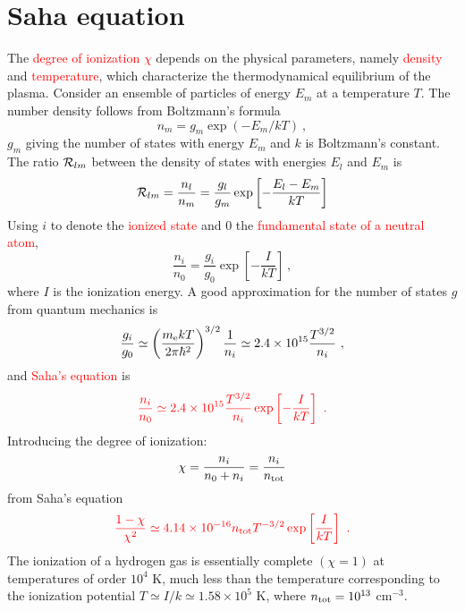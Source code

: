 \documentclass[12pt,a4paper]{article}
\begin{document}
\section{Saha equation}
\cite{2015bps..book.....C} The \textcolor{red}{degree of ionization $\chi$} depends on the physical parameters, namely \textcolor{red}{density} and \textcolor{red}{temperature}, which characterize the thermodynamical equilibrium of the plasma. Consider an ensemble of particles of energy $E_m$ at a temperature $T$. The number density follows from Boltzmann’s formula
\begin{equation*}
n_m = g_m \exp (-E_m/kT) ~,
\end{equation*}
$g_m$ giving the number of states with energy $E_m$ and $k$ is Boltzmann’s constant. The ratio ${\cal R}_{lm}$ between the density of states with energies $E_l$ and $E_m$ is
\begin{equation*}
{\cal R}_{lm} = \frac{n_l}{n_m} = \frac{g_l}{g_m} \exp\left[-\frac{E_l -E_m}{kT} \right]
\end{equation*}
Using $i$ to denote the \textcolor{red}{ionized state} and $0$ the \textcolor{red}{fundamental state of a neutral atom}, 
\begin{equation*}
\frac{n_i}{n_0} = \frac{g_i}{g_0} \exp\left[-\frac{I}{kT} \right] ~,
\end{equation*}
where $I$ is the ionization energy. A good approximation for the number of states $g$ from quantum mechanics is
\begin{equation*}
\frac{g_i}{g_0} \simeq \left(\frac{m_{\rm e} k T}{2\pi \hbar^2} \right)^{3/2} \frac{1}{n_i} \simeq 2.4\times 10^{15} \frac{T^{3/2}}{n_i} ~,
\end{equation*}
and \textcolor{red}{Saha’s equation} is
\begin{equation}
\color{red} \frac{n_i}{n_0} \simeq 2.4\times 10^{15} \frac{T^{3/2}}{n_i} \exp \left[-\frac{I}{kT} \right] ~.
\end{equation}
Introducing the degree of ionization:
\begin{equation}
\chi = \frac{n_i}{n_0 +n_i} = \frac{n_i}{n_{\rm tot}}
\end{equation}
from Saha's equation
\begin{equation}
\color{red} \frac{1-\chi}{\chi^2} \simeq 4.14\times 10^{-16} n_{\rm tot} T^{-3/2} \exp\left[\frac{I}{kT} \right] ~.
\end{equation}
The ionization of a hydrogen gas is essentially complete $(\chi = 1)$ at temperatures of order $10^4$ K, much less than the temperature corresponding to the ionization potential $T \simeq I/k \simeq 1.58 \times 10^5$ K, where $n_{\rm tot} = 10^{13}$ cm$^{-3}$.
\end{document}
